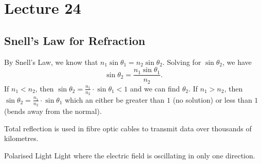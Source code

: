 \documentclass[class=article, crop=false]{standalone}
\begin{document}
  \section{Lecture 24}
  \subsection{Snell's Law for Refraction}
  By Snell's Law, we know that $n_1\sin\theta_1 = n_2\sin\theta_2$. Solving for $\sin\theta_2$, we have
  \[
    \sin\theta_2 = \frac{n_1\sin\theta_1}{n_2}.
  \]
  If $n_1 < n_2$, then $\sin\theta_2 = \frac{n_1}{n_2}\cdot \sin\theta_1 < 1$ and we can find $\theta_2$. If $n_1 > n_2$, then $\sin\theta_2 = \frac{n_1}{n_2}\cdot \sin\theta_1$ which an either be greater than $1$ (no solution) or less than $1$ (bends away from the normal).
  \begin{note}{}
    Total reflection is used in fibre optic cables to transmit data over thousands of kilometres.
  \end{note}
  \begin{definition}{Polarised Light}
    Light where the electric field is oscillating in only one direction.
  \end{definition}
\end{document}
